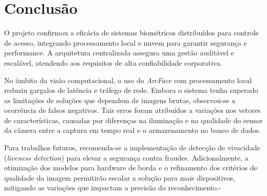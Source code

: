 \section{Conclusão}

O projeto confirmou a eficácia de sistemas biométricos distribuídos para controle de acesso, integrando processamento local e nuvem para garantir segurança e performance. A arquitetura centralizada assegura uma gestão auditável e escalável, atendendo aos requisitos de alta confiabilidade corporativa.

No âmbito da visão computacional, o uso do \textit{ArcFace} com processamento local reduziu gargalos de latência e tráfego de rede. Embora o sistema tenha superado as limitações de soluções que dependem de imagens brutas, observou-se a ocorrência de falsos negativos. Tais erros foram atribuídos a variações nos vetores de características, causadas por diferenças na iluminação e na qualidade do sensor da câmera entre a captura em tempo real e o armazenamento no banco de dados.

Para trabalhos futuros, recomenda-se a implementação de detecção de vivacidade (\textit{liveness detection}) para elevar a segurança contra fraudes. Adicionalmente, a otimização dos modelos para hardware de borda e o refinamento dos critérios de qualidade da imagem permitirão escalar a solução para mais dispositivos, mitigando as variações que impactam a precisão do reconhecimento.-